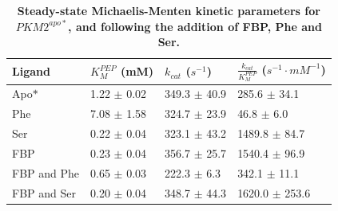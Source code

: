 %
%
%
%
\begin{table}[!ht]
\centering
\caption[Steady-state Michaelis-Menten kinetic parameters for $PKM2^{apo \ast}$, and following the addition of FBP, Phe and Ser.]{\textbf{Steady-state Michaelis-Menten kinetic parameters for $PKM2^{apo \ast}$, and following the addition of FBP, Phe and Ser.}}
\begin{tabular}{llll}
\hline
Ligand & $K_{M}^{PEP}$ (mM) & $k_{cat}$ ($s^{-1}$) & $\frac{k_{cat}}{K_{M}^{PEP}}$ ($s^{-1} \cdot mM^{-1}$) \\ \hline
Apo$\ast$ & 1.22 $\pm$ 0.02 & 349.3 $\pm$ 40.9 & 285.6 $\pm$ 34.1 \\
Phe & 7.08 $\pm$ 1.58 & 324.7 $\pm$ 23.9 & 46.8 $\pm$ 6.0 \\
Ser & 0.22 $\pm$ 0.04 & 323.1 $\pm$ 43.2 & 1489.8 $\pm$ 84.7 \\
FBP & 0.23 $\pm$ 0.04 & 356.7 $\pm$ 25.7 & 1540.4 $\pm$ 96.9 \\
FBP and Phe & 0.65 $\pm$ 0.03 & 222.3 $\pm$ 6.3 & 342.1 $\pm$ 11.1 \\
FBP and Ser & 0.20 $\pm$ 0.04 & 348.7 $\pm$ 44.3 & 1620.0 $\pm$ 253.6 \\ \hline
\end{tabular}
\label{tab:pkm2_activity_wildtype}
\end{table}

\clearpage



